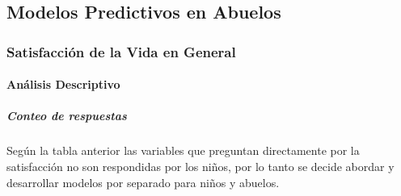 \documentclass[
]{article}
\begin{document}
\hypertarget{modelos-predictivos-en-abuelos}{%
\subsection{Modelos Predictivos en
Abuelos}\label{modelos-predictivos-en-abuelos}}

\hypertarget{satisfacciuxf3n-de-la-vida-en-general}{%
\subsubsection{Satisfacción de la Vida en
General}\label{satisfacciuxf3n-de-la-vida-en-general}}

\hypertarget{anuxe1lisis-descriptivo}{%
\paragraph{Análisis Descriptivo}\label{anuxe1lisis-descriptivo}}

\hypertarget{conteo-de-respuestas}{%
\subparagraph{Conteo de respuestas}\label{conteo-de-respuestas}}

\begin{table}[H]
\centering
{}
\end{table}

\begin{table}[H]
\centering
{}
\end{table}

Según la tabla anterior las variables que preguntan directamente por la
satisfacción no son respondidas por los niños, por lo tanto se decide
abordar y desarrollar modelos por separado para niños y abuelos.
\end{document}

